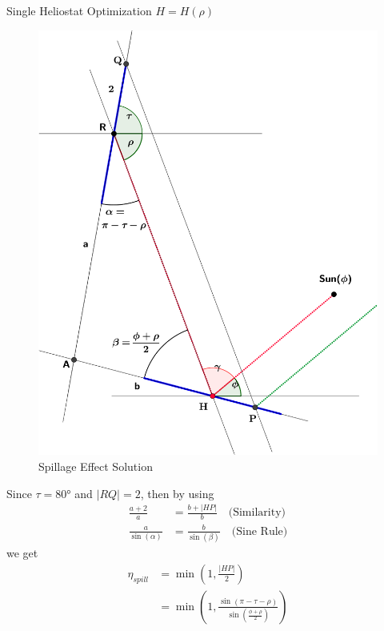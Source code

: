 \documentclass[10pt, xcolor={dvipsnames}]{beamer}
\begin{document}
\begin{frame}{Single Heliostat Optimization $H = H(\rho)$}
\begin{minipage}[t]{0.5\textwidth}
\begin{center}
\begin{figure}
\includegraphics[width=.99\textwidth]{../figures/spillage-solving-crop.pdf}
\caption{Spillage Effect Solution}
\end{figure}
\end{center}
\end{minipage}%
\begin{minipage}[t]{0.5\textwidth}
\vspace{2mm}
Since $\tau = 80$° and $|RQ| = 2$, then by using
\begin{align*}
\frac{a + 2}{a} &= \frac{b + |HP|}{b}
\quad \text{(Similarity)} \\[.5em]
\frac{a}{\sin(\alpha)} &= \frac{b}{\sin(\beta)}
\quad \text{(Sine Rule)}
\end{align*}
we get
\begin{align}
\eta_{spill} &= \min \left(1, \frac{|HP|}{2}\right) \\[.5em]
&= \min \left(1, 
\frac{\sin(\pi - \tau - \rho)}
{\sin \left( \frac{\phi + \rho}{2} \right)}
\right)
\end{align}
\end{minipage}
\end{frame}
\end{document}
